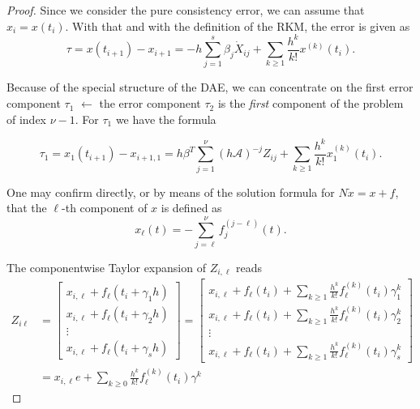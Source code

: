 \documentclass[]{book}
\theoremstyle{definition}
\theoremstyle{definition}
\theoremstyle{definition}
\theoremstyle{remark}
\begin{document}
\begin{proof}
{}Since we consider the pure consistency error, we can assume that \(x_i=x(t_i)\). With that and with the definition of the RKM, the error is given as
\[
\tau = x(t_{i+1}) - x_{i+1} = -h\sum_{j=1}^s \beta_j \dot X_{ij} + \sum_{k\geq 1} \frac{h^k}{k!}x^{(k)}(t_i).
\]

Because of the special structure of the DAE, we can concentrate on the first error component \(\tau_1\) \(\leftarrow\) the error component \(\tau_2\) is the \emph{first} component of the problem of index \(\nu-1\). For \(\tau_1\) we have the formula

\[
\tau_1 = x_1(t_{i+1}) - x_{i+1,1} = h\beta^T\sum_{j=1}^\nu (h\mathcal A)^{-j}Z_{ij} + \sum_{k\geq 1} \frac{h^k}{k!}x_1^{(k)}(t_i).
\]

One may confirm directly, or by means of the solution formula for \(N\dot x = x + f\), that the \(\ell\)-th component of \(x\) is defined as
\[
x_\ell(t) = - \sum_{j=\ell}^{\nu}f_j^{(j-\ell)}(t).
\]

The componentwise Taylor expansion of \(Z_{i,\ell}\) reads
\begin{align*}
Z_{i\ell} 
&= 
\begin{bmatrix}
x_{i,\ell} + f_\ell(t_i+\gamma_1 h) \\
x_{i,\ell} + f_\ell(t_i+\gamma_2 h) \\
\vdots \\
x_{i,\ell} + f_\ell(t_i+\gamma_s h) 
\end{bmatrix}
=
\begin{bmatrix}
    x_{i,\ell} + f_\ell(t_i) + \sum_{k\geq 1}\frac{h^k}{k!}f_\ell^{(k)}(t_i)\gamma_1^k \\
  x_{i,\ell} + f_\ell(t_i) + \sum_{k\geq 1}\frac{h^k}{k!}f_\ell^{(k)}(t_i)\gamma_2 ^k \\
\vdots \\
  x_{i,\ell} + f_\ell(t_i) + \sum_{k\geq 1}\frac{h^k}{k!}f_\ell^{(k)}(t_i)\gamma_s ^k 
\end{bmatrix} \\
&=
x_{i,\ell}e+\sum_{k\geq 0} \frac{h^k}{k!}f_\ell^{(k)}(t_i)\gamma^k
\end{align*}


\end{proof}
\end{document}
